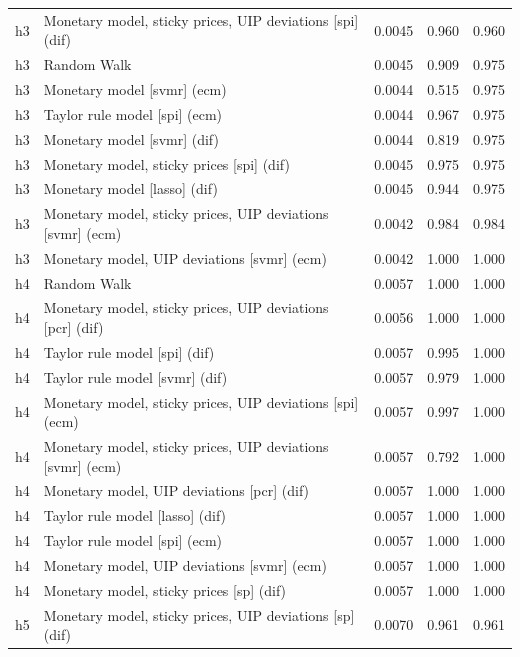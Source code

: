 \begin{ThreePartTable}
\begin{longtable}[t]{cp{5.5cm}ccc}
h3 & \raggedright Monetary model, sticky prices, UIP deviations [spi] (dif) & 0.0045 & 0.960 & 0.960\\
h3 & \raggedright Random Walk & 0.0045 & 0.909 & 0.975\\
h3 & \raggedright Monetary model [svmr] (ecm) & 0.0044 & 0.515 & 0.975\\
h3 & \raggedright Taylor rule model [spi] (ecm) & 0.0044 & 0.967 & 0.975\\
h3 & \raggedright Monetary model [svmr] (dif) & 0.0044 & 0.819 & 0.975\\
h3 & \raggedright Monetary model, sticky prices [spi] (dif) & 0.0045 & 0.975 & 0.975\\
h3 & \raggedright Monetary model [lasso] (dif) & 0.0045 & 0.944 & 0.975\\
h3 & \raggedright Monetary model, sticky prices, UIP deviations [svmr] (ecm) & 0.0042 & 0.984 & 0.984\\
h3 & \raggedright Monetary model, UIP deviations [svmr] (ecm) & 0.0042 & 1.000 & 1.000\\
\addlinespace
h4 & \raggedright Random Walk & 0.0057 & 1.000 & 1.000\\
h4 & \raggedright Monetary model, sticky prices, UIP deviations [pcr] (dif) & 0.0056 & 1.000 & 1.000\\
h4 & \raggedright Taylor rule model [spi] (dif) & 0.0057 & 0.995 & 1.000\\
h4 & \raggedright Taylor rule model [svmr] (dif) & 0.0057 & 0.979 & 1.000\\
h4 & \raggedright Monetary model, sticky prices, UIP deviations [spi] (ecm) & 0.0057 & 0.997 & 1.000\\
h4 & \raggedright Monetary model, sticky prices, UIP deviations [svmr] (ecm) & 0.0057 & 0.792 & 1.000\\
h4 & \raggedright Monetary model, UIP deviations [pcr] (dif) & 0.0057 & 1.000 & 1.000\\
h4 & \raggedright Taylor rule model [lasso] (dif) & 0.0057 & 1.000 & 1.000\\
h4 & \raggedright Taylor rule model [spi] (ecm) & 0.0057 & 1.000 & 1.000\\
h4 & \raggedright Monetary model, UIP deviations [svmr] (ecm) & 0.0057 & 1.000 & 1.000\\
h4 & \raggedright Monetary model, sticky prices [sp] (dif) & 0.0057 & 1.000 & 1.000\\
\addlinespace
h5 & \raggedright Monetary model, sticky prices, UIP deviations [sp] (dif) & 0.0070 & 0.961 & 0.961\\

\end{longtable}
\end{ThreePartTable}
